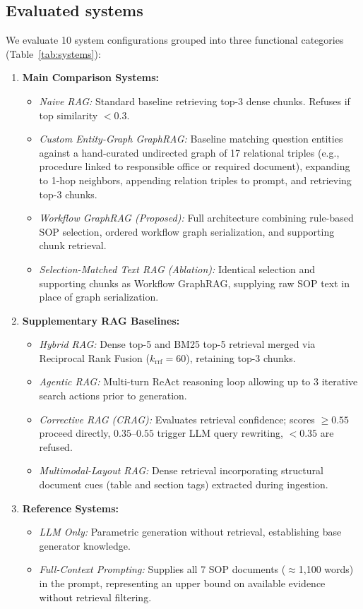 \documentclass[preprint,10pt]{elsarticle}
\begin{document}
\subsection{Evaluated systems}
\label{sec:systems}
We evaluate 10 system configurations grouped into three functional categories (Table~\ref{tab:systems}):
\begin{enumerate}[leftmargin=*]
\item \textbf{Main Comparison Systems:}
  \begin{itemize}
  \item \emph{Naive RAG:} Standard baseline retrieving top-3 dense chunks. Refuses if top similarity $< 0.3$.
  \item \emph{Custom Entity-Graph GraphRAG:} Baseline matching question entities against a hand-curated undirected graph of 17 relational triples (e.g., procedure linked to responsible office or required document), expanding to 1-hop neighbors, appending relation triples to prompt, and retrieving top-3 chunks.
  \item \emph{Workflow GraphRAG (Proposed):} Full architecture combining rule-based SOP selection, ordered workflow graph serialization, and supporting chunk retrieval.
  \item \emph{Selection-Matched Text RAG (Ablation):} Identical selection and supporting chunks as Workflow GraphRAG, supplying raw SOP text in place of graph serialization.
  \end{itemize}
\item \textbf{Supplementary RAG Baselines:}
  \begin{itemize}
  \item \emph{Hybrid RAG:} Dense top-5 and BM25 top-5 retrieval merged via Reciprocal Rank Fusion ($k_{\text{rrf}}=60$), retaining top-3 chunks.
  \item \emph{Agentic RAG:} Multi-turn ReAct reasoning loop allowing up to 3 iterative search actions prior to generation.
  \item \emph{Corrective RAG (CRAG):} Evaluates retrieval confidence; scores $\geq 0.55$ proceed directly, $0.35$--$0.55$ trigger LLM query rewriting, $< 0.35$ are refused.
  \item \emph{Multimodal-Layout RAG:} Dense retrieval incorporating structural document cues (table and section tags) extracted during ingestion.
  \end{itemize}
\item \textbf{Reference Systems:}
  \begin{itemize}
  \item \emph{LLM Only:} Parametric generation without retrieval, establishing base generator knowledge.
  \item \emph{Full-Context Prompting:} Supplies all 7 SOP documents ($\approx$1,100 words) in the prompt, representing an upper bound on available evidence without retrieval filtering.
  \end{itemize}
\end{enumerate}
\end{document}
